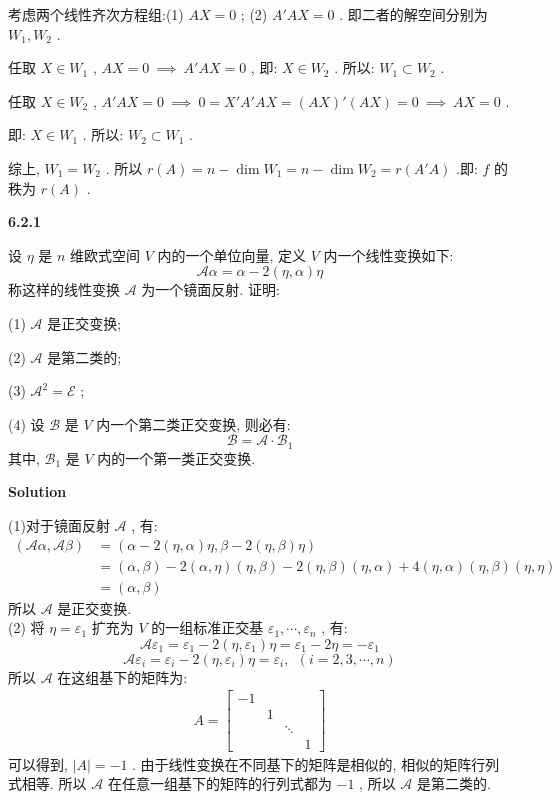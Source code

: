 \documentclass[11pt,a4paper,openany,oneside]{book}
\newcommand\Solution{\noindent\textbf{\textsf{Solution}}\par\medskip}
\begin{document}
考虑两个线性齐次方程组:(1)  $ AX = 0 $ ; (2)  $ A'AX = 0 $ . 即二者的解空间分别为 $ W_1, W_2 $ .

任取 $ X \in W_1 $ ,  $ AX = 0 \ \implies \ A'AX = 0 $ , 即: $ X \in W_2 $ . 所以: $ W_1 \subset W_2 $ .

任取 $ X \in W_2 $ ,  $ A'AX=0 \ \implies \ 0 = X'A'AX = (AX)'(AX) = 0 \ \implies \ AX = 0 $ .

即: $ X \in W_1 $ . 所以: $ W_2 \subset W_1 $ .

综上,  $ W_1 = W_2 $ . 所以 $ r(A) = n - \dim W_1 = n - \dim W_2 = r(A'A) $ .即: $ f $ 的秩为 $ r(A) $ .   


\begin{myexample}
	\textbf{6.2.1}

设 $ \eta $ 是 $ n $ 维欧式空间 $ V $ 内的一个单位向量, 定义 $ V $ 内一个线性变换如下:
 $$  \mathcal{A}\alpha = \alpha - 2(\eta, \alpha)\eta  $$ 
称这样的线性变换 $ \mathcal{A} $ 为一个镜面反射. 证明:

(1)  $ \mathcal{A} $ 是正交变换; 

(2)  $ \mathcal{A} $ 是第二类的;

(3)  $ \mathcal{A}^2 = \mathcal{E} $ ; 

(4) 设 $ \mathcal{B} $ 是 $ V $ 内一个第二类正交变换, 则必有:
 $$  \mathcal{B} = \mathcal{A} \cdot \mathcal{B}_1   $$ 
其中,  $ \mathcal{B}_1 $ 是 $ V $ 内的一个第一类正交变换. \\ 

\end{myexample}
\Solution 

(1)对于镜面反射 $ \mathcal{A} $ , 有:
\begin{align*}
(\mathcal{A}\alpha, \mathcal{A}\beta) &= (\alpha - 2(\eta, \alpha)\eta, \beta - 2(\eta, \beta)\eta)  \\
&= (\alpha, \beta) - 2(\alpha, \eta)(\eta, \beta) - 2(\eta, \beta)(\eta, \alpha) + 4(\eta, \alpha)(\eta, \beta)(\eta, \eta)  \\
&= (\alpha, \beta) 
\end{align*}
所以 $ \mathcal{A} $ 是正交变换.  \\

(2) 将 $ \eta = \varepsilon_1 $ 扩充为 $ V $ 的一组标准正交基 $ \varepsilon_1, \cdots, \varepsilon_n $ , 有:
 $$  \mathcal{A}\varepsilon_1 = \varepsilon_1 - 2(\eta, \varepsilon_1)\eta = \varepsilon_1 - 2\eta = -\varepsilon_1  $$ 
 $$  \mathcal{A}\varepsilon_i = \varepsilon_i - 2(\eta, \varepsilon_i)\eta = \varepsilon_i, \ \ (i=2,3, \cdots, n)  $$ 
所以 $ \mathcal{A} $ 在这组基下的矩阵为:
\begin{gather*}
A = 
\begin{bmatrix}
-1  &       &       &        \\
&   1   &       &         \\
&       & \ddots &       \\
&       &        &  1
\end{bmatrix}
\end{gather*}
可以得到,  $ |A| = -1 $ . 由于线性变换在不同基下的矩阵是相似的, 相似的矩阵行列式相等. 所以 $ \mathcal{A} $ 在任意一组基下的矩阵的行列式都为 $ -1 $ , 所以 $ \mathcal{A} $ 是第二类的. \\
\end{document}

